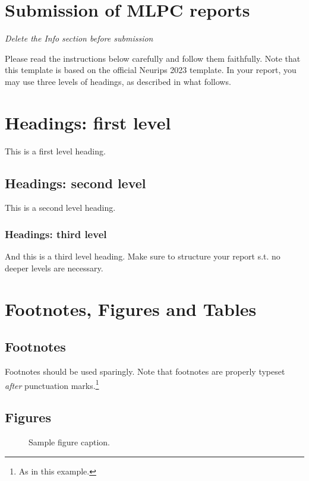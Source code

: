 \section{Submission of MLPC reports}

\emph{Delete the Info section before submission}

Please read the instructions below carefully and follow them faithfully. Note that this template is based on the official Neurips 2023 template. In your report, you may use three levels of headings, as described in what follows. 

\section{Headings: first level}
\label{sec:headings}

This is a first level heading. 

\subsection{Headings: second level}

This is a second level heading. 

\subsubsection{Headings: third level}

And this is a third level heading. Make sure to structure your report s.t. no deeper levels are necessary. 

\section{Footnotes, Figures and Tables}

\subsection{Footnotes}
Footnotes should be used sparingly. Note that footnotes are properly typeset \emph{after} punctuation marks.\footnote{As in this example.}

\subsection{Figures}

\begin{figure}[h]
  \centering
  \fbox{\rule[-.5cm]{0cm}{4cm} \rule[-.5cm]{4cm}{0cm}}
  \caption{Sample figure caption.}
  \label{fig:example}
\end{figure}


